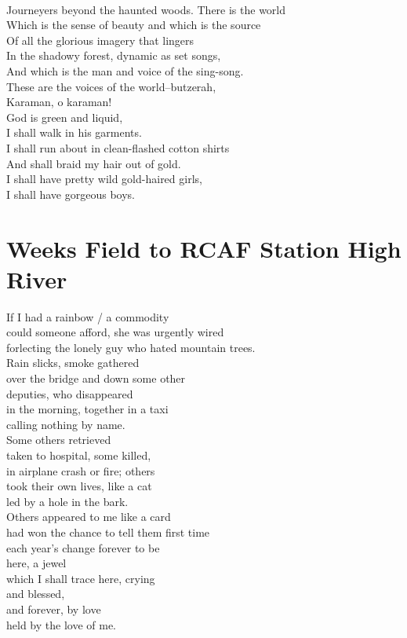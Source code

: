 \documentclass[smalldemyvopaper,11pt,twoside,onecolumn,openright,extrafontsizes]{memoir}
\begin{document}
\\Journeyers beyond the haunted woods. There is the world
\\Which is the sense of beauty and which is the source
\\Of all the glorious imagery that lingers
\\In the shadowy forest, dynamic as set songs,
\\And which is the man and voice of the sing-song.
\\These are the voices of the world--butzerah,
\\Karaman, o karaman!
\\God is green and liquid,
\\I shall walk in his garments.
\\I shall run about in clean-flashed cotton shirts
\\And shall braid my hair out of gold.
\\I shall have pretty wild gold-haired girls,
\\I shall have gorgeous boys.



\chapter{Weeks Field to RCAF Station High River}
If I had a rainbow / a commodity
\\could someone afford, she was urgently wired
\\forlecting the lonely guy who hated mountain trees.
\\Rain slicks, smoke gathered
\\over the bridge and down some other
\\deputies, who disappeared
\\in the morning, together in a taxi
\\calling nothing by name.
\\Some others retrieved
\\taken to hospital, some killed,
\\in airplane crash or fire; others
\\took their own lives, like a cat
\\led by a hole in the bark.
\\Others appeared to me like a card
\\had won the chance to tell them first time
\\each year's change forever to be
\\here, a jewel
\\which I shall trace here, crying
\\and blessed,
\\and forever, by love
\\held by the love of me.
\end{document}
